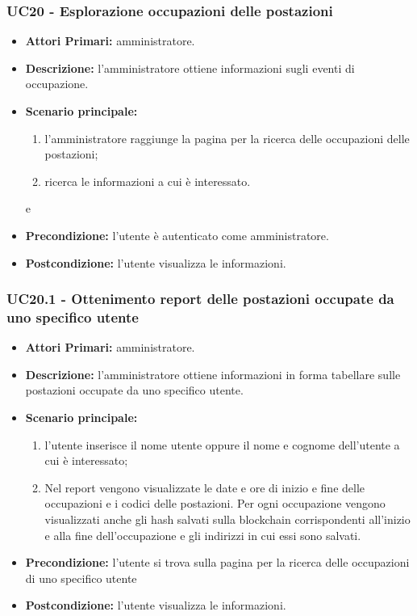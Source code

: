 \subsubsection{ UC20 - Esplorazione occupazioni delle postazioni}
\begin{itemize}
	\item\textbf{Attori Primari:} 
	amministratore.
	\item\textbf{Descrizione:} 
	l'amministratore ottiene informazioni sugli eventi di occupazione.
	\item\textbf{Scenario principale:} 
	\begin{enumerate}
		\item l'amministratore raggiunge la pagina per la ricerca delle occupazioni delle postazioni;
		\item ricerca le informazioni a cui è interessato.
	\end{enumerate}	 e 
	\item\textbf{Precondizione:} 
	l'utente è autenticato come amministratore.
	\item\textbf{Postcondizione:}
	l'utente visualizza le informazioni.
\end{itemize}

\subsubsection{ UC20.1 - Ottenimento report delle postazioni occupate da uno specifico utente}
\begin{itemize}
           	\item\textbf{Attori Primari:} 
           	amministratore.
           	\item\textbf{Descrizione:} 
           	l'amministratore ottiene informazioni in forma tabellare sulle postazioni occupate da uno specifico utente.
           	\item\textbf{Scenario principale:} 
           	\begin{enumerate}
           		\item l'utente inserisce il nome utente oppure il nome e cognome dell'utente a cui è interessato;
           		\item Nel report vengono visualizzate le date e ore di inizio e fine delle occupazioni e i codici delle postazioni.
           		Per ogni occupazione vengono visualizzati anche gli hash salvati sulla blockchain corrispondenti all'inizio e alla fine dell'occupazione e gli indirizzi in cui essi sono salvati.
           	\end{enumerate}
           	\item\textbf{Precondizione:} 
           	l'utente si trova sulla pagina per la ricerca delle occupazioni di uno specifico utente
           	\item\textbf{Postcondizione:}
           	l'utente visualizza le informazioni.
\end{itemize}

